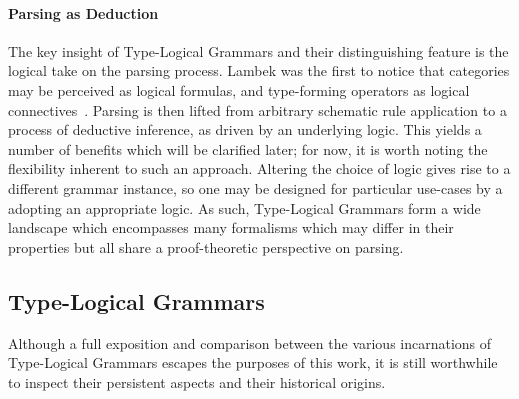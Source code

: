 \paragraph{Parsing as Deduction}
The key insight of Type-Logical Grammars and their distinguishing feature is the logical take on the parsing process.
Lambek was the first to notice that categories may be perceived as logical formulas, and type-forming operators as logical connectives~\cite{lambek1958mathematics}.
Parsing is then lifted from arbitrary schematic rule application to a process of deductive inference, as driven by an underlying logic.
This yields a number of benefits which will be clarified later; for now, it is worth noting the flexibility inherent to such an approach.
Altering the choice of logic gives rise to a different grammar instance, so one may be designed for particular use-cases by a adopting an appropriate logic.
As such, Type-Logical Grammars form a wide landscape which encompasses many formalisms which may differ in their properties but all share a proof-theoretic perspective on parsing.

\subsection{Type-Logical Grammars}
Although a full exposition and comparison between the various incarnations of Type-Logical Grammars escapes the purposes of this work, it is still worthwhile to inspect their persistent aspects and their historical origins.

